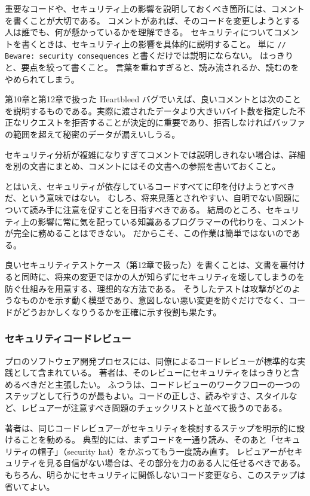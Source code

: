 \documentclass[uplatex]{jsarticle}
\def\label#1{}%
\begin{document}
重要なコードや、セキュリティ上の影響を説明しておくべき箇所には、コメントを書くことが大切である。
コメントがあれば、そのコードを変更しようとする人は誰でも、何が懸かっているかを理解できる。
セキュリティについてコメントを書くときは、セキュリティ上の影響を具体的に説明すること。
単に \verb|// Beware: security consequences| と書くだけでは説明にならない。
はっきりと、要点を絞って書くこと。
言葉を重ねすぎると、読み流されるか、読むのをやめられてしまう。

\begin{exa}\label{exa:ch13-heartbleed-comment}
第10章と第12章で扱った Heartbleed バグでいえば、良いコメントとは次のことを説明するものである。実際に渡されたデータより大きいバイト数を指定した不正なリクエストを拒否することが決定的に重要であり、拒否しなければバッファの範囲を超えて秘密のデータが漏えいしうる。
\end{exa}

セキュリティ分析が複雑になりすぎてコメントでは説明しきれない場合は、詳細を別の文書にまとめ、コメントにはその文書への参照を書いておくこと。

とはいえ、セキュリティが依存しているコードすべてに印を付けようとすべきだ、という意味ではない。
むしろ、将来見落とされやすい、自明でない問題について読み手に注意を促すことを目指すべきである。
結局のところ、セキュリティ上の影響に常に気を配っている知識あるプログラマーの代わりを、コメントが完全に務めることはできない。
だからこそ、この作業は簡単ではないのである。

良いセキュリティテストケース（第12章で扱った）を書くことは、文書を裏付けると同時に、将来の変更でほかの人が知らずにセキュリティを壊してしまうのを防ぐ仕組みを用意する、理想的な方法である。
そうしたテストは攻撃がどのようなものかを示す動く模型であり、意図しない悪い変更を防ぐだけでなく、コードがどうおかしくなりうるかを正確に示す役割も果たす。

\subsubsection{セキュリティコードレビュー}

プロのソフトウェア開発プロセスには、同僚によるコードレビューが標準的な実践として含まれている。
著者は、そのレビューにセキュリティをはっきりと含めるべきだと主張したい。
ふつうは、コードレビューのワークフローの一つのステップとして行うのが最もよい。コードの正しさ、読みやすさ、スタイルなど、レビュアーが注意すべき問題のチェックリストと並べて扱うのである。

著者は、同じコードレビュアーがセキュリティを検討するステップを明示的に設けることを勧める。
典型的には、まずコードを一通り読み、そのあと「セキュリティの帽子」（security hat）をかぶってもう一度読み直す。
レビュアーがセキュリティを見る自信がない場合は、その部分を力のある人に任せるべきである。
もちろん、明らかにセキュリティに関係しないコード変更なら、このステップは省いてよい。
\end{document}
